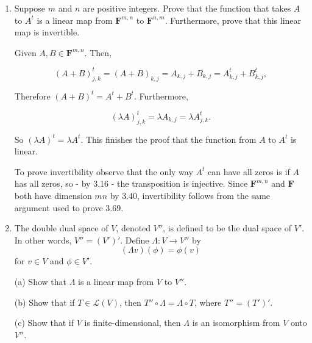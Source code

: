 \documentclass{book}
\begin{document}
\begin{enumerate}
(c) \(\iff\) (b), (e) \(\iff\) (d): This follows from 2.21 and 2.31: if vectors are linearly dependent then we can delete one and keep a list with the same span that contains a basis, so the dimension of their span is less than \(n\).  However, if the vectors are linearly independent then the dimension of their span is exactly \(n\) by 3.117.  This argument applies to both \(\textbf{F}^{n,1}\) and \(\textbf{F}^{1,n}\) (in fact, to all finite-dimensional spaces).

\item Suppose \(m\) and \(n\) are positive integers.  Prove that the function that takes \(A\) to \(A^t\) is a linear map from \(\textbf{F}^{m,n}\) to \(\textbf{F}^{n,m}\).  Furthermore, prove that this linear map is invertible.

Given \(A,B \in \textbf{F}^{m,n}\).  Then,

\begin{equation*}
    (A+B)^t_{j,k}=(A+B)_{k,j}=A_{k,j}+B_{k,j}=A^t_{k,j}+B^t_{k,j},
\end{equation*}

Therefore \((A+B)^t=A^t+B^t\).  Furthermore,

\begin{equation*}
    (\lambda A)^t_{j,k}=\lambda A_{k,j}=\lambda A^t_{j,k}.
\end{equation*}

So \((\lambda A)^t=\lambda A^t\).  This finishes the proof that the function from \(A\) to \(A^t\) is linear.

To prove invertibility observe that the only way \(A^t\) can have all zeros is if \(A\) has all zeros, so - by 3.16 - the transposition is injective.  Since \(\textbf{F}^{m,n}\) and \(\textbf{F}^{}\) both have dimension \(mn\) by 3.40, invertibility follows from the same argument used to prove 3.69.

\item The double dual space of \(V\), denoted \(V''\), is defined to be the dual space of \(V'\).  In other words, \(V''=(V')'\).  Define \(\Lambda:V \rightarrow V''\) by \[(\Lambda v)(\phi)=\phi(v)\] for \(v \in V\) and \(\phi \in V'\).

(a) Show that \(\Lambda\) is a linear map from \(V\) to \(V''\).

(b) Show that if \(T \in \mathcal{L}(V)\), then \(T'' \circ \Lambda = \Lambda \circ T\), where \(T''=(T')'\).

(c) Show that if \(V\) is finite-dimensional, then \(\Lambda\) is an isomorphism from \(V\) onto \(V''\).


\end{enumerate}
\end{document}
